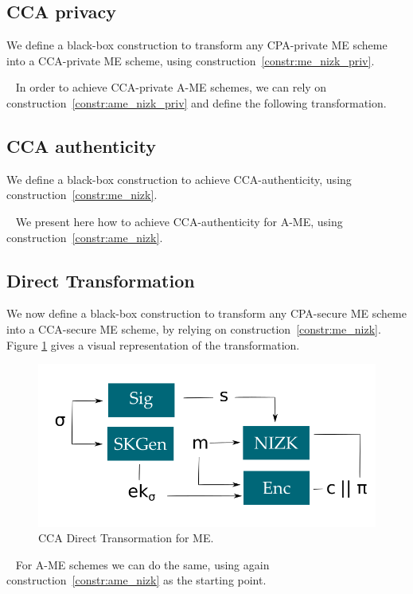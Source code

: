\subsection{CCA privacy}\label{sec:cca-priv-transformation}
We define a black-box construction to transform any CPA-private ME scheme into a CCA-private ME scheme, using construction~\ref{constr:me_nizk_priv}.

~\newline
In order to achieve CCA-private A-ME schemes, we can rely on construction~\ref{constr:ame_nizk_priv} and define the following transformation.


\subsection{CCA authenticity}\label{sec:cca-auth-transformation}
We define a black-box construction to achieve CCA-authenticity, using construction~\ref{constr:me_nizk}.

~\newline
We present here how to achieve CCA-authenticity for A-ME, using construction~\ref{constr:ame_nizk}.


\subsection{Direct Transformation}\label{sec:cca-full-transformation}
We now define a black-box construction to transform any CPA-secure ME scheme into a CCA-secure ME scheme, by relying on construction~\ref{constr:me_nizk}.
Figure \ref{fig:cca_constr} gives a visual representation of the transformation.
\begin{figure}[ht]
    \centering
    \includegraphics[width=\linewidth]{images/cca_constr.png}
    \caption{CCA Direct Transormation for ME.}
    \label{fig:cca_constr}
\end{figure}


~\newline
For A-ME schemes we can do the same, using again construction~\ref{constr:ame_nizk} as the starting point.

